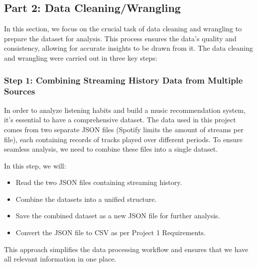 \documentclass[
]{article}
\providecommand{\tightlist}{%
  \setlength{\itemsep}{0pt}\setlength{\parskip}{0pt}}
\begin{document}
\subsection{Part 2: Data
Cleaning/Wrangling}\label{part-2-data-cleaningwrangling}

In this section, we focus on the crucial task of data cleaning and
wrangling to prepare the dataset for analysis. This process ensures the
data's quality and consistency, allowing for accurate insights to be
drawn from it. The data cleaning and wrangling were carried out in three
key steps:

\subsubsection{Step 1: Combining Streaming History Data from Multiple
Sources}\label{step-1-combining-streaming-history-data-from-multiple-sources}

In order to analyze listening habits and build a music recommendation
system, it's essential to have a comprehensive dataset. The data used in
this project comes from two separate JSON files (Spotify limits the
amount of streams per file), each containing records of tracks played
over different periods. To ensure seamless analysis, we need to combine
these files into a single dataset.

In this step, we will:

\begin{itemize}
\tightlist
\item
  Read the two JSON files containing streaming history.
\item
  Combine the datasets into a unified structure.
\item
  Save the combined dataset as a new JSON file for further analysis.
\item
  Convert the JSON file to CSV as per Project 1 Requirements.
\end{itemize}

This approach simplifies the data processing workflow and ensures that
we have all relevant information in one place.
\end{document}
